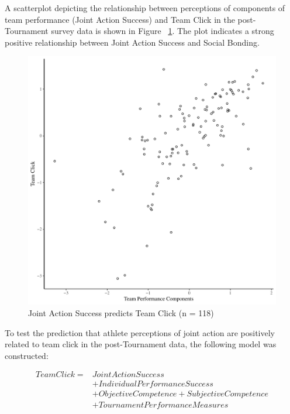 \begin{landscape}
A scatterplot depicting the relationship between perceptions of components of team performance (Joint Action Success) and Team Click in the post-Tournament survey data is shown in Figure ~\ref{fig:jasClickBasicXY}. The plot indicates a strong positive relationship between Joint Action Success and Social Bonding.

\begin{figure}[htbp]
\includegraphics[width = \linewidth]{images/jasClickBasicXY.pdf}
  \caption{Joint Action Success predicts Team Click (n = 118)}
  \label{fig:jasClickBasicXY}
\end{figure}


To test the prediction that athlete perceptions of joint action are positively
related to team click in the post-Tournament data, the following model was constructed:

\begin{equation}
  \begin{align*}
    Team Click =  & Joint Action Success\\
              & + Individual Performance Success \\
              & + Objective Competence + Subjective Competence\\
              & + TournamentPerformanceMeasures \\
  \end{align*}
\end{equation}
\bigskip


\end{landscape}

